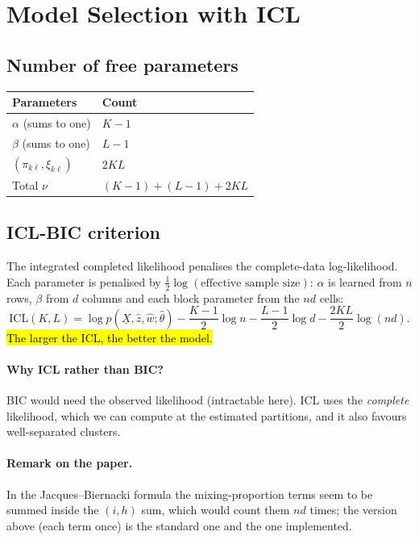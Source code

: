 \section{Model Selection with ICL}

\subsection{Number of free parameters}

\begin{center}
\begin{tabular}{ll}
\toprule
Parameters & Count \\
\midrule
$\alpha$ (sums to one) & $K-1$ \\
$\beta$ (sums to one) & $L-1$ \\
$(\pi_{k\ell},\xi_{k\ell})$ & $2KL$ \\
\midrule
Total $\nu$ & $(K-1)+(L-1)+2KL$ \\
\bottomrule
\end{tabular}
\end{center}

\subsection{ICL-BIC criterion}

The integrated completed likelihood penalises the complete-data
log-likelihood. Each parameter is penalised by $\tfrac12\log(\text{effective sample size})$:
$\alpha$ is learned from $n$ rows, $\beta$ from $d$ columns and each block
parameter from the $nd$ cells:
\[
\boxed{
\text{ICL}(K,L)
=
\log p(\underline{X},\hat z,\hat w;\hat\theta)
-\frac{K-1}{2}\log n
-\frac{L-1}{2}\log d
-\frac{2KL}{2}\log(nd).
}
\]
\hl{The larger the ICL, the better the model.}

\paragraph{Why ICL rather than BIC?}
BIC would need the observed likelihood (intractable here). ICL uses the
\emph{complete} likelihood, which we can compute at the estimated
partitions, and it also favours well-separated clusters.

\paragraph{Remark on the paper.} In the Jacques--Biernacki formula the
mixing-proportion terms seem to be summed inside the $(i,h)$ sum, which
would count them $nd$ times; the version above (each term once) is the
standard one and the one implemented.

